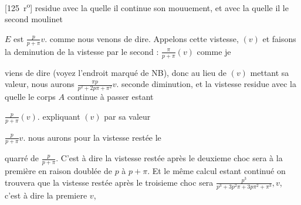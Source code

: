 [125~r\textsuperscript{o}]
residue avec la quelle il continue son mouuement, et avec la quelle 
il
le second moulinet \rule[-4mm]{0mm}{10mm}$\displaystyle E$ est $\displaystyle \frac{p}{p + \pi}v$. comme nous venons de dire. Appelons cette vistesse\protect{}, $\displaystyle (v)$ et faisons
la deminution de la vistesse par le second
:
$\displaystyle \frac{\pi}{p + \pi} (v)$ comme je \rule[-4mm]{0mm}{10mm}viens de dire (voyez l'endroit marqu\'{e} de NB), donc au lieu de $\displaystyle (v)$ mettant sa valeur, nous aurons $\displaystyle \frac{\pi p}{p^2 + 2p \pi + \pi ^2} v$. seconde diminution, et la vistesse residue avec la quelle le corps $\displaystyle A$ continue \`{a} passer estant \rule[-4mm]{0mm}{10mm}$\displaystyle \frac{p}{p + \pi} (v)$. expliquant $\displaystyle (v)$ par sa valeur \rule[-4mm]{0mm}{10mm}$\displaystyle \frac{p}{p + \pi} v$. nous aurons pour la vistesse 
rest\'{e}e
\pend
\newpage
\pstart\noindent le \rule[-4mm]{0mm}{8mm}quarr\'{e} de $\displaystyle \frac{p}{p + \pi}$. C'est \`{a} dire la vistesse rest\'{e}e apr\`{e}s le deuxieme choc sera \`{a} la premi\`{e}re en raison doubl\'{e}e de $\displaystyle p$ \`{a} $\displaystyle p + \pi$. Et le m\^{e}me calcul estant continu\'{e} on trouvera que la vistesse rest\'{e}e apr\`{e}s le troisieme choc sera $\displaystyle \frac{p^3}{p^3 + 3p^2 \pi + 3p \pi ^2 + \pi ^3 }, v$, c'est \`{a} dire la premiere $\displaystyle v$, %
